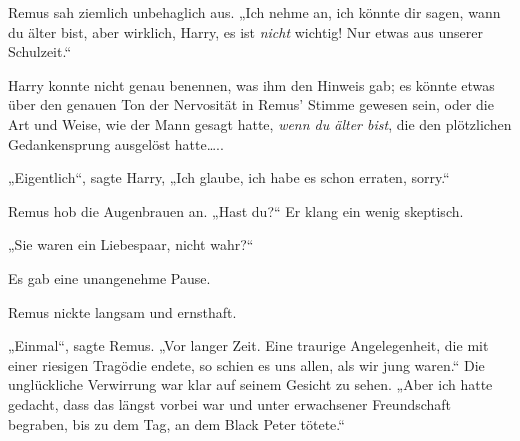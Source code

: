 Remus sah ziemlich unbehaglich aus. „Ich nehme an, ich könnte dir sagen, wann du älter bist, aber wirklich, Harry, es ist \emph{nicht} wichtig! Nur etwas aus unserer Schulzeit.“

Harry konnte nicht genau benennen, was ihm den Hinweis gab; es könnte etwas über den genauen Ton der Nervosität in Remus' Stimme gewesen sein, oder die Art und Weise, wie der Mann gesagt hatte, \emph{wenn du älter bist}, die den plötzlichen Gedankensprung ausgelöst hatte…..

„Eigentlich“, sagte Harry, „Ich glaube, ich habe es schon erraten, sorry.“

Remus hob die Augenbrauen an. „Hast du?“ Er klang ein wenig skeptisch.

„Sie waren ein Liebespaar, nicht wahr?“

Es gab eine unangenehme Pause.

Remus nickte langsam und ernsthaft.

„Einmal“, sagte Remus. „Vor langer Zeit. Eine traurige Angelegenheit, die mit einer riesigen Tragödie endete, so schien es uns allen, als wir jung waren.“ Die unglückliche Verwirrung war klar auf seinem Gesicht zu sehen. „Aber ich hatte gedacht, dass das längst vorbei war und unter erwachsener Freundschaft begraben, bis zu dem Tag, an dem Black Peter tötete.“

